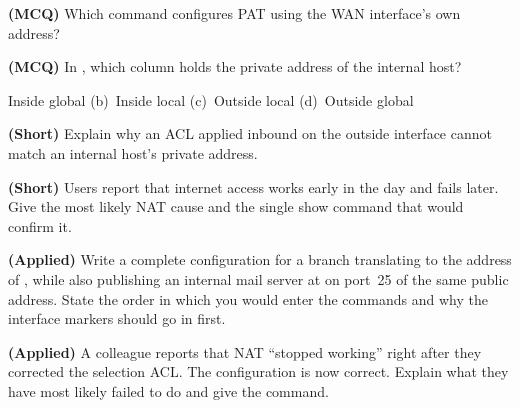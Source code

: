 \begin{reviewq}
  \item \textbf{(MCQ)} Which command configures PAT using the WAN interface's own
        address?
        \begin{tight}
          \item[(a)] 
          \item[(b)] 
          \item[(c)] 
          \item[(d)] 
        \end{tight}
  \item \textbf{(MCQ)} In , which column holds the
        private address of the internal host?
        \begin{tight}
          \item[(a)] Inside global \quad (b)~Inside local
          \quad (c)~Outside local \quad (d)~Outside global
        \end{tight}
  \item \textbf{(Short)} Explain why an ACL applied inbound on the outside
        interface cannot match an internal host's private address.
  \item \textbf{(Short)} Users report that internet access works early in the day
        and fails later. Give the most likely NAT cause and the single show
        command that would confirm it.
  \item \textbf{(Applied)} Write a complete configuration for a branch translating
         to the address of , while
        also publishing an internal mail server at  on port~25
        of the same public address. State the order in which you would enter the
        commands and why the interface markers should go in first.
  \item \textbf{(Applied)} A colleague reports that NAT ``stopped working'' right
        after they corrected the selection ACL. The configuration is now correct.
        Explain what they have most likely failed to do and give the command.
\end{reviewq}
